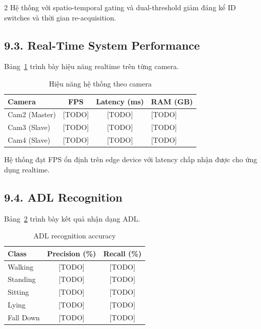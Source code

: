 \documentclass[a4paper,13pt]{article}
\begin{document}
\begin{multicols}{2}
Hệ thống với spatio-temporal gating và dual-threshold giảm đáng kể ID switches và thời gian re-acquisition.

\subsection*{9.3. Real-Time System Performance}

Bảng~\ref{tab:system_perf} trình bày hiệu năng realtime trên từng camera.

\begin{table}[H]
\centering
\caption{Hiệu năng hệ thống theo camera}
\label{tab:system_perf}
\fontsize{10}{12}\selectfont
\renewcommand{\arraystretch}{1.3}
\begin{tabular}{lccl}
\toprule
\textbf{Camera} & \textbf{FPS} & \textbf{Latency (ms)} & \textbf{RAM (GB)} \\
\midrule
Cam2 (Master) & [TODO] & [TODO] & [TODO] \\
Cam3 (Slave) & [TODO] & [TODO] & [TODO] \\
Cam4 (Slave) & [TODO] & [TODO] & [TODO] \\
\bottomrule
\end{tabular}
\end{table}

Hệ thống đạt FPS ổn định trên edge device với latency chấp nhận được cho ứng dụng realtime.

\subsection*{9.4. ADL Recognition}

Bảng~\ref{tab:adl_results} trình bày kết quả nhận dạng ADL.

\begin{table}[H]
\centering
\caption{ADL recognition accuracy}
\label{tab:adl_results}
\fontsize{11}{13}\selectfont
\renewcommand{\arraystretch}{1.3}
\begin{tabular}{lcc}
\toprule
\textbf{Class} & \textbf{Precision (\%)} & \textbf{Recall (\%)} \\
\midrule
Walking & [TODO] & [TODO] \\
Standing & [TODO] & [TODO] \\
Sitting & [TODO] & [TODO] \\
Lying & [TODO] & [TODO] \\
Fall Down & [TODO] & [TODO] \\
\bottomrule
\end{tabular}
\end{table}


\end{multicols}
\end{document}
